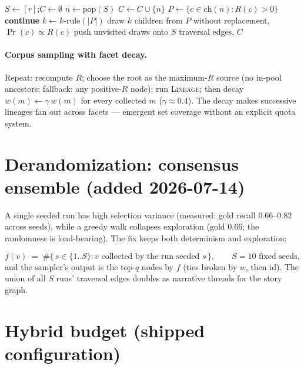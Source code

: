 \documentclass[11pt]{article}
\newcommand{\ch}{\mathrm{ch}}
\begin{document}
\begin{algorithm}[h]
\caption{\textsc{Lineage}$(r, G, w, R, k\text{-rule})$}
\begin{algorithmic}[1]
\State $S \gets [r]$;\quad $C \gets \emptyset$ 
  \State $n \gets \mathrm{pop}(S)$
   $C \gets C \cup \{n\}$ 
  \EndIf
  \State $P \gets \{c \in \ch(n) : R(c) > 0\}$
   \textbf{continue} 
  \EndIf
  \State $k \gets k\text{-rule}(|P|)$ 
  \State draw $k$ children from $P$ without replacement, $\Pr(c)\propto R(c)$
  \State push unvisited draws onto $S$
\EndWhile
\State \Return traversal edges, $C$
\end{algorithmic}
\end{algorithm}

\paragraph{Corpus sampling with facet decay.} Repeat: recompute $R$; choose the root
as the maximum-$R$ source (no in-pool ancestors; fallback: any positive-$R$ node); run
\textsc{Lineage}; then decay $w(m) \gets \gamma\, w(m)$ for every collected $m$
($\gamma \approx 0.4$). The decay makes successive lineages fan out across facets —
emergent set coverage without an explicit quota system.

\section{Derandomization: consensus ensemble (added 2026-07-14)}

A single seeded run has high selection variance (measured: gold recall
$0.66$--$0.82$ across seeds), while a greedy walk collapses exploration (gold
$0.66$; the randomness is load-bearing). The fix keeps both determinism and
exploration:

\[
  f(v) \;=\; \#\{\,s \in \{1..S\} : v \text{ collected by the run seeded } s\,\},
  \qquad S=10 \text{ fixed seeds},
\]
and the sampler's output is the top-$q$ nodes by $f$ (ties broken by $w$, then id).
The union of all $S$ runs' traversal edges doubles as narrative threads for the
story graph.

\section{Hybrid budget (shipped configuration)}
\end{document}
